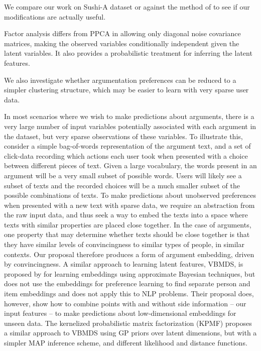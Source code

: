 We compare our work on Sushi-A dataset or against the method of \cite{khan2014scalable} to see if 
our modifications are actually useful. 

Factor analysis differs from PPCA in allowing only diagonal noise covariance matrices, making 
the observed variables conditionally independent given the latent variables. It also provides
a probabilistic treatment for inferring the latent features. %

We also investigate whether argumentation preferences can be reduced to a simpler
clustering structure, which may be easier to learn with very sparse user data.



In most scenarios where we wish to make predictions about arguments, 
there is a very large number of input variables potentially associated with each argument in the dataset,
but very sparse observations of these variables. 
To illustrate this, consider a simple bag-of-words representation of the argument text, and a set
of click-data recording which actions each user took when presented with a choice between different pieces of text. 
Given a large vocabulary, the words present in an argument will be a very small subset of possible words. Users will likely see a subset of texts and the recorded choices will be a much smaller subset of 
the possible combinations of texts. 
To make predictions about unobserved preferences when presented with a new text with sparse data,
we require an abstraction from the raw input data, and thus seek a way to embed the texts into a space 
where texts with similar properties are placed close together. In the case of arguments, one property
that may determine whether texts should be close together is that they have similar levels of 
convincingness to similar types of people, in similar contexts. Our proposal therefore produces
a form of argument embedding, driven by convincingness.
A similar approach to learning latent features, VBMDS, is proposed by \cite{soh2016distance} for learning embeddings using approximate Bayesian techniques, but does not use the embeddings for 
preference learning to find separate person and item embeddings and does not apply this to NLP problems.
Their proposal does, however, show how to combine points with and without side information -- our
input features -- to make predictions about low-dimensional embeddings for unseen data. 
The kernelized probabilistic matrix factorization (KPMF) \cite{zhou2012kernelized} 
proposes a similar approach to VBMDS using GP priors over latent dimensions, but with a simpler
MAP inference scheme, and different likelihood and distance functions. 

